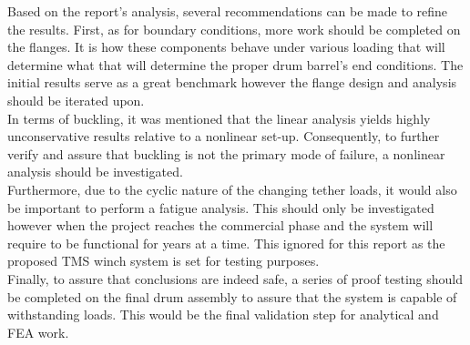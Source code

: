 
Based on the report's analysis, several recommendations can be made to refine the results. First, as for boundary conditions, more work should be completed on the flanges. It is how these components behave under various loading that will determine what that will determine the proper drum barrel's end conditions. The initial results serve as a great benchmark however the flange design and analysis should be iterated upon.\\

In terms of buckling, it was mentioned that the linear analysis yields highly unconservative results relative to a nonlinear set-up. Consequently, to further verify and assure that buckling is not the primary mode of failure, a nonlinear analysis should be investigated.\\

Furthermore, due to the cyclic nature of the changing tether loads, it would also be important to perform a fatigue analysis. This should only be investigated however when the project reaches the commercial phase and the system will require to be functional for years at a time. This ignored for this report as the proposed TMS winch system is set for testing purposes.\\

Finally, to assure that conclusions are indeed safe, a series of proof testing should be completed on the final drum assembly to assure that the system is capable of withstanding loads. This would be the final validation step for analytical and FEA work.
